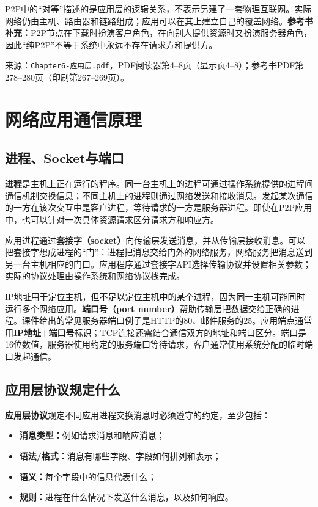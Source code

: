 P2P中的“对等”描述的是应用层的逻辑关系，不表示另建了一套物理互联网。实际网络仍由主机、路由器和链路组成；应用可以在其上建立自己的覆盖网络。\textbf{参考书补充：}P2P节点在下载时扮演客户角色，在向别人提供资源时又扮演服务器角色，因此“纯P2P”不等于系统中永远不存在请求方和提供方。

\annotationarea[4]
\small 来源：\texttt{Chapter6-应用层.pdf}，PDF阅读器第4--8页（显示页4--8）；参考书PDF第278--280页（印刷第267--269页）。\normalsize

\section{网络应用通信原理}
\subsection{进程、Socket与端口}
\textbf{进程}是主机上正在运行的程序。同一台主机上的进程可通过操作系统提供的进程间通信机制交换信息；不同主机上的进程则通过网络发送和接收消息。发起某次通信的一方在该次交互中是客户进程，等待请求的一方是服务器进程。即使在P2P应用中，也可以针对一次具体资源请求区分请求方和响应方。

应用进程通过\textbf{套接字（socket）}向传输层发送消息，并从传输层接收消息。可以把套接字想成进程的“门”：进程把消息交给门外的网络服务，网络服务把消息送到另一台主机相应的门口。应用程序通过套接字API选择传输协议并设置相关参数；实际的协议处理由操作系统和网络协议栈完成。

IP地址用于定位主机，但不足以定位主机中的某个进程，因为同一主机可能同时运行多个网络应用。\textbf{端口号（port number）}帮助传输层把数据交给正确的进程。课件给出的常见服务器端口例子是HTTP的80、邮件服务的25。应用端点通常用\textbf{IP地址+端口号}标识；TCP连接还需结合通信双方的地址和端口区分。端口是16位数值，服务器使用约定的服务端口等待请求，客户通常使用系统分配的临时端口发起通信。

\subsection{应用层协议规定什么}
\textbf{应用层协议}规定不同应用进程交换消息时必须遵守的约定，至少包括：
\begin{itemize}[nosep]
\item \textbf{消息类型：}例如请求消息和响应消息；
\item \textbf{语法/格式：}消息有哪些字段、字段如何排列和表示；
\item \textbf{语义：}每个字段中的信息代表什么；
\item \textbf{规则：}进程在什么情况下发送什么消息，以及如何响应。
\end{itemize}

